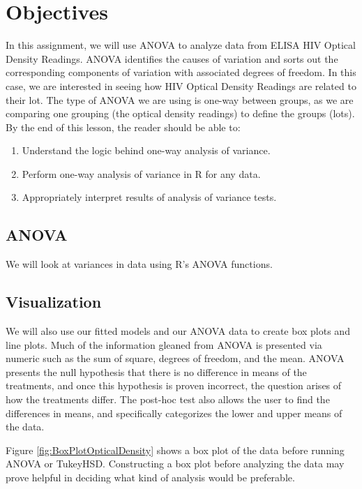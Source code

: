 \section{Objectives}

In this assignment, we will use ANOVA to analyze data from ELISA HIV Optical Density Readings.
ANOVA identifies the causes of variation and sorts out the corresponding components of variation with associated degrees of freedom. 
In this case, we are interested in seeing how HIV Optical Density Readings are related to their lot. 
The type of ANOVA we are using is one-way between groups, as we are comparing one grouping (the optical density readings) to define the groups (lots). 
\singlespacing
By the end of this lesson, the reader should be able to:
\begin{enumerate}
        \item Understand the logic behind one-way analysis of variance.
        \item Perform one-way analysis of variance in R for any data. 
        \item Appropriately interpret results of analysis of variance tests.
\end{enumerate}

\subsection{ANOVA}

We will look at variances in data using R's ANOVA functions.

\subsection{Visualization}

We will also use our fitted models and our ANOVA data to create box plots and line plots.
Much of the information gleaned from ANOVA is presented via numeric such as the sum of square, degrees of freedom, and the mean.
ANOVA presents the null hypothesis that there is no difference in means of the treatments, and once this hypothesis is proven incorrect, the question arises of how the treatments differ.
The post-hoc test also allows the user to find the differences in means, and specifically categorizes the lower and upper means of the data.

Figure \ref{fig:BoxPlotOpticalDensity} shows a box plot of the data before running ANOVA or TukeyHSD.
Constructing a box plot before analyzing the data may prove helpful in deciding what kind of analysis would be preferable.

